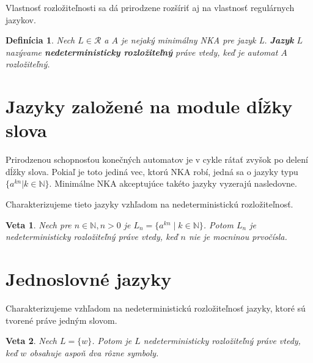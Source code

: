 \documentclass[myposter,portrait]{sciposter}
\def\mysection#1{
{\color{sectionCol}\section*{\sc\bfseries #1}}}
\newtheorem*{definition}{Definícia}
\newtheorem*{theorem}{Veta}
\begin{document}
\begin{multicols*}{3}
Vlastnosť rozložiteľnosti sa dá prirodzene rozšíriť aj na vlastnosť regulárnych jazykov.\\

\begin{definition}
\label{def:nedeterministic_decomposability_of_language}
Nech $ L \in \mathscr{R} $ a $ A $ je nejaký minimálny NKA pre jazyk L. \textbf{Jazyk} $ L $ nazývame \textbf{nedeterministicky rozložiteľný} práve vtedy, keď je automat $ A $ rozložiteľný.
\end{definition}


\mysection{Jazyky založené na module dĺžky slova}

Prirodzenou schopnosťou konečných automatov je v cykle rátať zvyšok po delení dĺžky slova. Pokiaľ je toto jediná vec, ktorú NKA robí, jedná sa o jazyky typu $ \lbrace a^{kn} | k \in \mathbb{N} \rbrace $. Minimálne NKA akceptujúce takéto jazyky vyzerajú nasledovne.

\begin{figure}[H]
\centering
{}
\end{figure}

Charakterizujeme tieto jazyky vzhľadom na nedeterministickú rozložiteľnosť.

\begin{theorem}
\label{thm:primes_compounds}
Nech pre $ n \in \mathbb{N}, n > 0 $ je $ L_n = \lbrace a^{kn} \; | \; k \in \mathbb{N} \rbrace $. Potom $ L_n $ je nedeterministicky rozložiteľný práve vtedy, keď $ n $ nie je mocninou prvočísla.
\end{theorem}

\mysection{Jednoslovné jazyky} 
Charakterizujeme vzhľadom na nedeterministickú rozložiteľnosť jazyky, ktoré sú tvorené práve jedným slovom.

\bigskip

\begin{theorem}
\label{thm:singleton_characterization}
Nech $ L = \lbrace w \rbrace $. Potom je $ L $ nedeterministicky rozložiteľný práve vtedy, keď $ w $ obsahuje aspoň dva rôzne symboly.
\end{theorem}


\end{multicols*}
\end{document}
